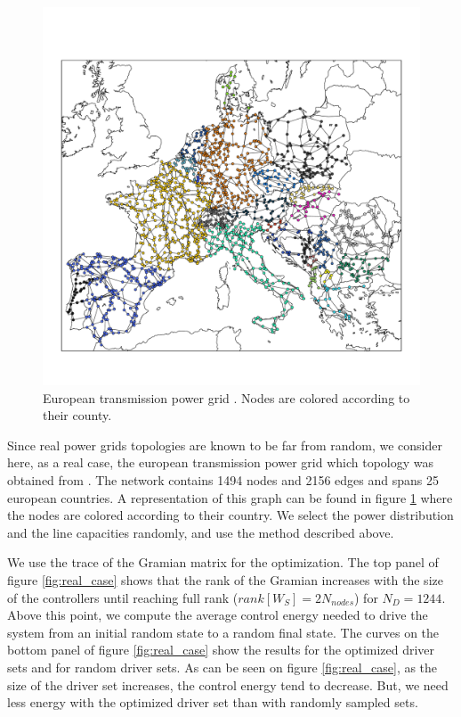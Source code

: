 \documentclass[conference]{IEEEtran}
\begin{document}
\begin{figure}
\includegraphics[scale=.25]{power_grid}
\caption{European transmission power grid \cite{jensen_2015_35177}. Nodes are colored according to their county.}
\label{fig:network}
\end{figure}

Since real power grids topologies are known to be far from random, we consider here, as a real case, the european transmission power grid which topology was obtained from \cite{jensen_2015_35177}. The network contains 1494 nodes and 2156 edges and spans 25 european countries. A representation of this graph can be found in figure \ref{fig:network} where the nodes are colored according to their country. We select the power distribution and the line capacities randomly, and use the method described above.

We use the trace of the Gramian matrix for the optimization. The top panel of figure \ref{fig:real_case} shows that the rank of the Gramian increases with the size of the controllers until reaching full rank ($rank[W_S] = 2 N_{nodes}$) for $N_D=1244$. Above this point, we compute the average control energy needed to drive the system from an initial random state to a random final state. The curves on the bottom panel of figure \ref{fig:real_case} show the results for the optimized driver sets and for random driver sets. As can be seen on figure \ref{fig:real_case}, as the size of the driver set increases, the control energy tend to decrease. But, we need less energy with the optimized driver set than with randomly sampled sets.   
\end{document}
